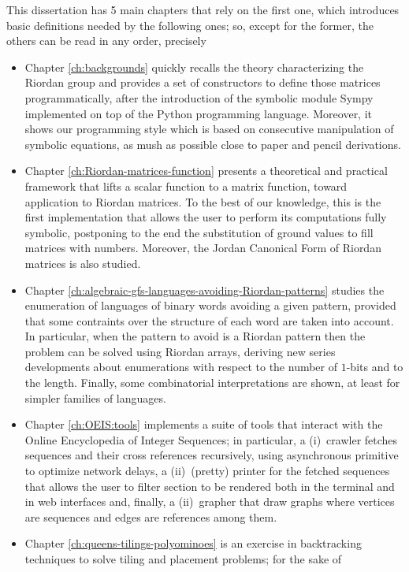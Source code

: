 This dissertation has 5 main chapters that rely on the first one, which
introduces basic definitions needed by the following ones; so, except for the
former, the others can be read in any order, precisely
\begin{itemize}
\item Chapter \ref{ch:backgrounds} quickly recalls the theory characterizing
the Riordan group and provides a set of constructors to define those matrices
programmatically, after the introduction of the symbolic module Sympy
implemented on top of the Python programming language. Moreover, it shows our
programming style which is based on consecutive manipulation of symbolic
equations, as mush as possible close to paper and pencil derivations.
\item Chapter \ref{ch:Riordan-matrices-function} presents a theoretical and
practical framework that lifts a scalar function to a matrix function, toward
application to Riordan matrices. To the best of our knowledge, this is the
first implementation that allows the user to perform its computations fully
symbolic, postponing to the end the substitution of ground values to fill
matrices with numbers. Moreover, the Jordan Canonical Form of Riordan matrices
is also studied.
\item Chapter \ref{ch:algebraic-gfs-languages-avoiding-Riordan-patterns}
studies the enumeration of languages of binary words avoiding a given pattern,
provided that some contraints over the structure of each word are taken into
account.  In particular, when the pattern to avoid is a Riordan pattern then
the problem can be solved using Riordan arrays, deriving new series
developments about enumerations with respect to the number of $1$-bits and to
the length. Finally, some combinatorial interpretations are shown, at least for
simpler families of languages.
\item Chapter \ref{ch:OEIS:tools} implements a suite of tools that interact with
the Online Encyclopedia of Integer Sequences; in particular, a (i)~crawler fetches
sequences and their cross references recursively, using asynchronous primitive
to optimize network delays, a (ii)~(pretty) printer for the fetched sequences that
allows the user to filter section to be rendered both in the terminal and in
web interfaces and, finally, a (ii)~grapher that draw graphs where vertices
are sequences and edges are references among them.
\item Chapter \ref{ch:queens-tilings-polyominoes} is an exercise in
backtracking techniques to solve tiling and placement problems; for the sake of

\end{itemize}

